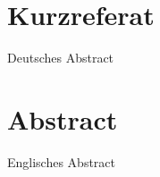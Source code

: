 \thispagestyle{empty}
\section*{Kurzreferat}

Deutsches Abstract

\section*{Abstract}

Englisches Abstract
